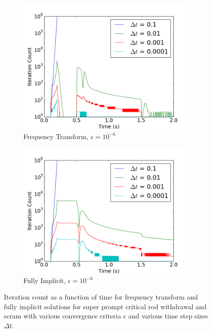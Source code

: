 \documentclass[12pt]{report}
\begin{document}
\begin{figure}[ht]
			\begin{subfigure}{.5\textwidth}
				\centering
				\includegraphics[width=.95\linewidth]{figs/iter_case2_conv2.png}
				\caption{Frequency Transform, $\epsilon = 10^{-6}$}
				\label{fig::iter_2_3_ft}
			\end{subfigure}%
			\begin{subfigure}{.5\textwidth}
				\centering
				\includegraphics[width=.95\linewidth]{figs/iter_case2_conv2_omega0.png}
				\caption{Fully Implicit, $\epsilon = 10^{-6}$}
				\label{fig::iter_2_3_fi}
			\end{subfigure}
			\caption{Iteration count as a function of time for frequency transform and fully implicit solutions for super prompt critical rod withdrawal and scram with various convergence criteria $\epsilon$ and various time step sizes $\Delta t$.}
			\label{fig::iter_2}
		\end{figure}
	\clearpage
\end{document}

